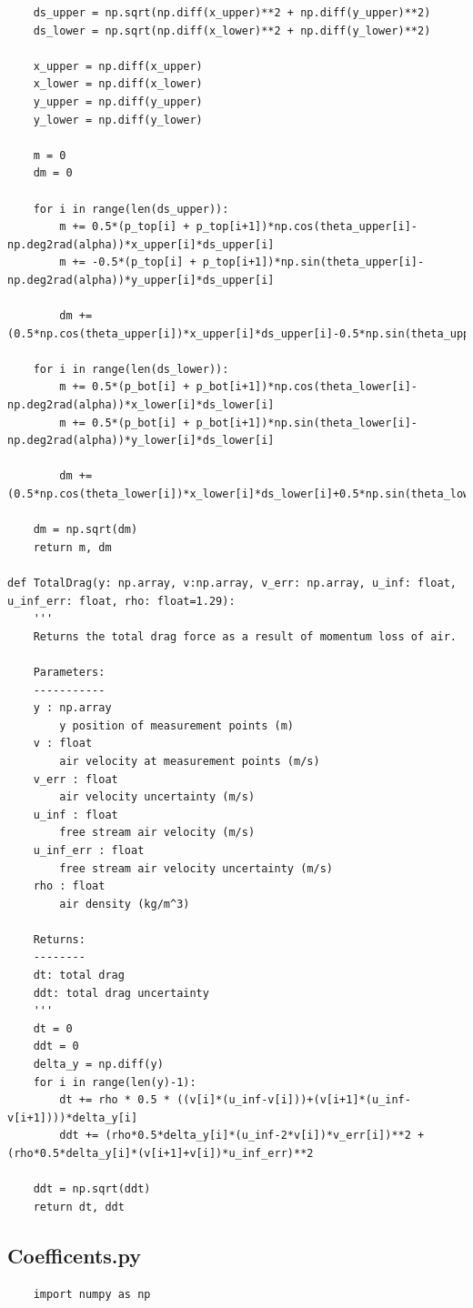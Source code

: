 \documentclass[11pt, letterpaper]{article}
\begin{document}
\begin{appendices}
\begin{verbatim}
    ds_upper = np.sqrt(np.diff(x_upper)**2 + np.diff(y_upper)**2)
    ds_lower = np.sqrt(np.diff(x_lower)**2 + np.diff(y_lower)**2)   

    x_upper = np.diff(x_upper)
    x_lower = np.diff(x_lower)
    y_upper = np.diff(y_upper)
    y_lower = np.diff(y_lower)

    m = 0
    dm = 0

    for i in range(len(ds_upper)):
        m += 0.5*(p_top[i] + p_top[i+1])*np.cos(theta_upper[i]-np.deg2rad(alpha))*x_upper[i]*ds_upper[i]
        m += -0.5*(p_top[i] + p_top[i+1])*np.sin(theta_upper[i]-np.deg2rad(alpha))*y_upper[i]*ds_upper[i]

        dm += (0.5*np.cos(theta_upper[i])*x_upper[i]*ds_upper[i]-0.5*np.sin(theta_upper[i])*y_upper[i]*ds_upper[i]*p_err_top[i])**2

    for i in range(len(ds_lower)):
        m += 0.5*(p_bot[i] + p_bot[i+1])*np.cos(theta_lower[i]-np.deg2rad(alpha))*x_lower[i]*ds_lower[i]
        m += 0.5*(p_bot[i] + p_bot[i+1])*np.sin(theta_lower[i]-np.deg2rad(alpha))*y_lower[i]*ds_lower[i]

        dm += (0.5*np.cos(theta_lower[i])*x_lower[i]*ds_lower[i]+0.5*np.sin(theta_lower[i])*y_lower[i]*ds_lower[i]*p_err_bot[i])**2
    
    dm = np.sqrt(dm)
    return m, dm

def TotalDrag(y: np.array, v:np.array, v_err: np.array, u_inf: float, u_inf_err: float, rho: float=1.29):
    '''
    Returns the total drag force as a result of momentum loss of air.

    Parameters:
    -----------   
    y : np.array
        y position of measurement points (m)
    v : float
        air velocity at measurement points (m/s)
    v_err : float
        air velocity uncertainty (m/s)
    u_inf : float
        free stream air velocity (m/s)
    u_inf_err : float
        free stream air velocity uncertainty (m/s)
    rho : float
        air density (kg/m^3)

    Returns:
    --------
    dt: total drag
    ddt: total drag uncertainty
    '''
    dt = 0
    ddt = 0
    delta_y = np.diff(y)
    for i in range(len(y)-1):
        dt += rho * 0.5 * ((v[i]*(u_inf-v[i]))+(v[i+1]*(u_inf-v[i+1])))*delta_y[i]
        ddt += (rho*0.5*delta_y[i]*(u_inf-2*v[i])*v_err[i])**2 + (rho*0.5*delta_y[i]*(v[i+1]+v[i])*u_inf_err)**2

    ddt = np.sqrt(ddt)
    return dt, ddt
\end{verbatim}
\subsection{Coefficents.py}
\begin{verbatim}
    import numpy as np


\end{verbatim}
\end{appendices}
\end{document}
